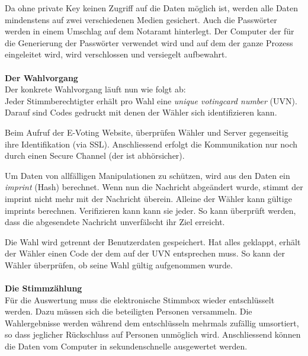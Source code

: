 \documentclass[10pt,a4paper]{article} %
\begin{document}
\begin{multicols}{3}
Da ohne private Key keinen Zugriff auf die Daten möglich ist, werden alle Daten mindenstens auf zwei verschiedenen Medien gesichert. Auch die Passwörter werden in einem Umschlag auf dem Notaramt hinterlegt.
Der Computer der für die Generierung der Passwörter verwendet wird und auf dem der ganze Prozess eingeleitet wird, wird verschlossen und versiegelt aufbewahrt.
\\\\
\textbf{Der Wahlvorgang}
\\
Der konkrete Wahlvorgang läuft nun wie folgt ab:\\
Jeder Stimmberechtigter erhält pro Wahl eine \textit{unique votingcard number} (UVN). Darauf sind Codes gedruckt mit denen der Wähler sich identifizieren kann.

Beim Aufruf der E-Voting Website, überprüfen Wähler und Server gegenseitig ihre Identifikation (via SSL).
Anschliessend erfolgt die Kommunikation nur noch durch einen Secure Channel (der ist abhörsicher).

Um Daten von allfälligen Manipulationen zu schützen, wird aus den Daten ein \textit{imprint} (Hash) berechnet. Wenn nun die Nachricht abgeändert wurde, stimmt der imprint nicht mehr mit der Nachricht überein. Alleine der Wähler kann gültige imprints berechnen. Verifizieren kann kann sie jeder.
So kann überprüft werden, dass die abgesendete Nachricht unverfälscht ihr Ziel erreicht.

Die Wahl wird getrennt der Benutzerdaten gespeichert.
Hat alles geklappt, erhält der Wähler einen Code der dem auf der UVN entsprechen muss. So kann der Wähler überprüfen, ob seine Wahl gültig aufgenommen wurde.
\\\\
\textbf{Die Stimmzählung}
\\
Für die Auswertung muss die elektronische Stimmbox wieder entschlüsselt werden. Dazu müssen sich die beteiligten Personen versammeln. Die Wahlergebnisse werden während dem entschlüsseln mehrmals zufällig umsortiert, so dass jeglicher Rückschluss auf Personen unmöglich wird.
Anschliessend können die Daten vom Computer in sekundenschnelle ausgewertet werden.








\end{multicols}
\end{document}
